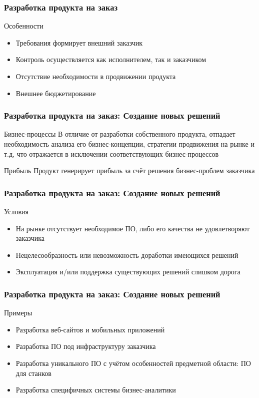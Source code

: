 \documentclass{../industrial-development}
\begin{document}
\begin{frame} \frametitle{Разработка продукта на заказ}
	\begin{block}{Особенности}
		\begin{itemize}
			\item Требования формирует внешний заказчик
			\item Контроль осуществляется как исполнителем, так и заказчиком
			\item Отсутствие необходимости в продвижении продукта
			\item Внешнее бюджетирование
		\end{itemize}
	\end{block}
\end{frame}
	

\begin{frame} \frametitle{Разработка продукта на заказ: Создание новых решений}
	\begin{block}{Бизнес-процессы}
		В отличие от разработки собственного продукта, отпадает необходимость анализа его бизнес-концепции, стратегии продвижения на рынке и т.д, что отражается в исключении соответствующих бизнес-процессов
	\end{block}
	\begin{block}{Прибыль}
		Продукт генерирует прибыль за счёт решения бизнес-проблем заказчика
	\end{block}
\end{frame}


\begin{frame} \frametitle{Разработка продукта на заказ: Создание новых решений}
	\begin{block}{Условия}
		\begin{itemize}
			\item На рынке отсутствует необходимое ПО, либо его качества не удовлетворяют заказчика
			\item Нецелесообразность или невозможность доработки имеющихся решений
			\item Эксплуатация и/или поддержка существующих решений слишком дорога
		\end{itemize}
	\end{block}
\end{frame}


\begin{frame} \frametitle{Разработка продукта на заказ: Создание новых решений}
	\begin{block}{Примеры}
		\begin{itemize}
			\item Разработка веб-сайтов и мобильных приложений
			\item Разработка ПО под инфраструктуру заказчика
			\item Разработка уникального ПО с учётом особенностей предметной области: ПО для станков
			\item Разработка специфичных системы бизнес-аналитики
		\end{itemize}
	\end{block}
\end{frame}
\end{document}
